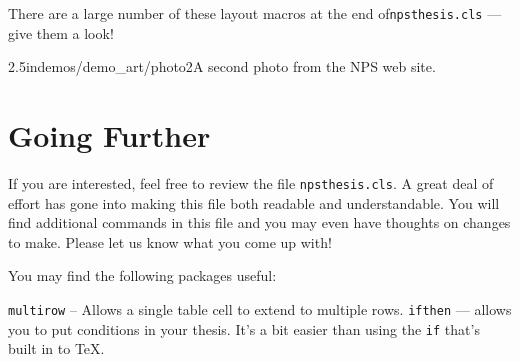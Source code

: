 There are a large number of these layout macros at the end
of\verb+npsthesis.cls+ --- give them a look!

           {2.5in}{demos/demo_art/photo2}{A second photo from the NPS
             web site.}

\section{Going Further}
If you are interested, feel free to review the file
\verb+npsthesis.cls+. A great deal of effort has gone into making this
file both readable and understandable. You will find additional
commands in this file and you may even have thoughts on changes to
make. Please let us know what you come up with!

You may find the following packages useful:

\verb+multirow+ -- Allows a single table cell to extend to multiple
rows.
\verb+ifthen+ --- allows you to put conditions in your thesis. It's a
bit easier than using the \verb+if+ that's built in to \TeX.



